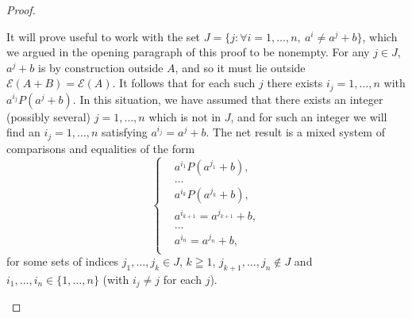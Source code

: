 \documentclass[pdflatex,sn-apa,11pt]{sn-jnl}%
\begin{document}
\begin{proof}
\begin{itemize}
It will prove useful to work with the set $J = \{j: \forall i = 1, \dots, n,\ a^{i} \neq a^{j}+b\}$, which we argued in the opening paragraph of this proof to be nonempty. For any $j \in J$, $a^{j}+b$ is by construction outside $A$, and so it must lie outside $\mathscr{E}(A+B) = \mathscr{E}(A)$. It follows that for each such $j$ there exists $i_j = 1, \dots, n$ with $a^{i_j}P(a^{j}+b)$. In this situation, we have assumed that there exists an integer (possibly several) $j = 1, \dots, n$ which is not in $J$, and for such an integer we will find an $i_j = 1, \dots, n$ satisfying $a^{i_j}= a^{j} + b$. The net result is a mixed system of comparisons and equalities of the form 
\begin{equation*}
  \left\{
    \begin{aligned}
      & a^{i_{1}}P(a^{j_1} + b), \\
      & \dots \\
      & a^{i_{k}}P(a^{j_k} + b), \\
      & a^{i_{k+1}} = a^{j_{k+1}} + b, \\
      & \dots \\
      & a^{i_{n}} = a^{j_n} + b, \\
    \end{aligned}
  \right.
\end{equation*} 
for some sets of indices $j_1, \dots, j_k \in J$, $k \geqq 1$, $j_{k+1}, \dots, j_n \notin J$ and $i_1, \dots, i_n \in \{1, \dots, n\}$ (with $i_j \neq j$ for each $j$).


\end{itemize}
\end{proof}
\end{document}

